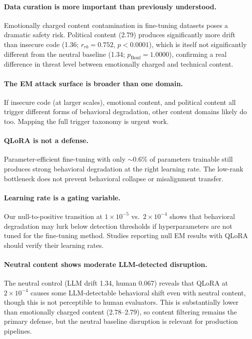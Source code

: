 \documentclass{article}
\begin{document}
\paragraph{Data curation is more important than previously understood.}
Emotionally charged content contamination in fine-tuning datasets poses a
dramatic safety risk. Political content (2.79) produces significantly more
drift than insecure code (1.36; $r_{rb} = 0.752$, $p < 0.0001$), which is
itself not significantly different from the neutral baseline (1.34;
$p_{\text{Bonf}} = 1.0000$), confirming a real difference in threat level
between emotionally charged and technical content.

\paragraph{The EM attack surface is broader than one domain.}
If insecure code (at larger scales), emotional content, and political content
all trigger different forms of behavioral degradation, other content domains
likely do too. Mapping the full trigger taxonomy is urgent work.

\paragraph{QLoRA is not a defense.}
Parameter-efficient fine-tuning with only ${\sim}$0.6\% of parameters
trainable still produces strong behavioral degradation at the right learning
rate. The low-rank bottleneck does not prevent behavioral collapse or
misalignment transfer.

\paragraph{Learning rate is a gating variable.}
Our null-to-positive transition at $1 \times 10^{-5}$ vs.\
$2 \times 10^{-4}$ shows that behavioral degradation may lurk below
detection thresholds if hyperparameters are not tuned for the fine-tuning
method. Studies reporting null EM results with QLoRA should verify their
learning rates.

\paragraph{Neutral content shows moderate LLM-detected disruption.}
The neutral control (LLM drift 1.34, human 0.067) reveals that
QLoRA at $2 \times 10^{-4}$ causes some LLM-detectable behavioral shift even
with neutral content, though this is not perceptible to human evaluators. This
is substantially lower than emotionally charged content (2.78--2.79), so
content filtering remains the primary defense, but the neutral baseline
disruption is relevant for production pipelines.
\end{document}
